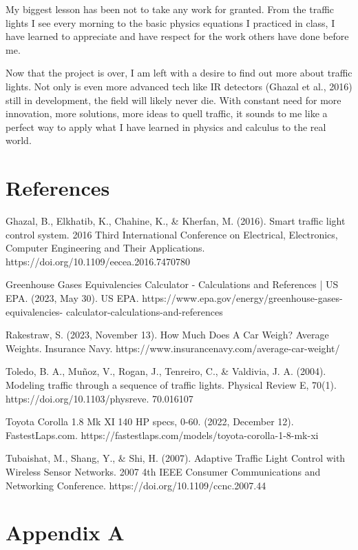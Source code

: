 \documentclass[11pt]{article}
\begin{document}
My biggest lesson has been not to take any work for granted. From the traffic lights I see every morning to the basic physics equations I practiced in class, I have learned to appreciate and have respect for the work others have done before me.

Now that the project is over, I am left with a desire to find out more about traffic lights. Not only is even more advanced tech like IR detectors (Ghazal et al., 2016) still in development, the field will likely never die. With constant need for more innovation, more solutions, more ideas to quell traffic, it sounds to me like a perfect way to apply what I have learned in physics and calculus to the real world.

\section{References}

Ghazal, B., Elkhatib, K., Chahine, K., \& Kherfan, M. (2016). Smart traffic light control system. 2016 Third International Conference on Electrical, Electronics, Computer Engineering and Their Applications. https://doi.org/10.1109/eecea.2016.7470780 

Greenhouse Gases Equivalencies Calculator - Calculations and References | US EPA. (2023, May 30). US EPA. https://www.epa.gov/energy/greenhouse-gases-equivalencies-
calculator-calculations-and-references 

Rakestraw, S. (2023, November 13). How Much Does A Car Weigh? Average Weights. Insurance Navy. https://www.insurancenavy.com/average-car-weight/ 

Toledo, B. A., Muñoz, V., Rogan, J., Tenreiro, C., \& Valdivia, J. A. (2004). Modeling traffic through a sequence of traffic lights. Physical Review E, 70(1). https://doi.org/10.1103/physreve.
70.016107 

Toyota Corolla 1.8 Mk XI 140 HP specs, 0-60. (2022, December 12). FastestLaps.com. https://fastestlaps.com/models/toyota-corolla-1-8-mk-xi 

Tubaishat, M., Shang, Y., \& Shi, H. (2007). Adaptive Traffic Light Control with Wireless Sensor Networks. 2007 4th IEEE Consumer Communications and Networking Conference. https://doi.org/10.1109/ccnc.2007.44

\section{Appendix A}
\end{document}
